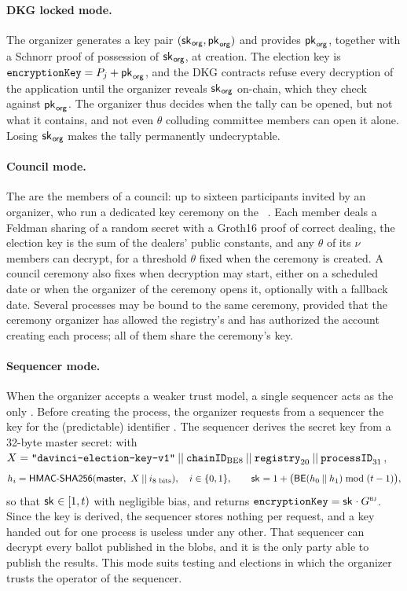 \paragraph{\ac{DKG} locked mode.} The organizer generates a key pair $({\sf{sk}^{}}_{\mathsf{org}}, {\sf{pk}^{}}_{\mathsf{org}})$ and provides ${\sf{pk}^{}}_{\mathsf{org}}$, together with a Schnorr proof of possession of ${\sf{sk}^{}}_{\mathsf{org}}$, at creation. The election key is $\texttt{encryptionKey} = P_j + {\sf{pk}^{}}_{\mathsf{org}}$, and the \ac{DKG} contracts refuse every decryption of the application until the organizer reveals ${\sf{sk}^{}}_{\mathsf{org}}$ on-chain, which they check against ${\sf{pk}^{}}_{\mathsf{org}}$. The organizer thus decides when the tally can be opened, but not what it contains, and not even $\theta$ colluding committee members can open it alone. Losing ${\sf{sk}^{}}_{\mathsf{org}}$ makes the tally permanently undecryptable.

\paragraph{Council mode.} The \keywardens are the members of a council: up to sixteen participants invited by an organizer, who run a dedicated key ceremony on the \councilmanager~\cite{davinci-council}. Each member deals a Feldman sharing of a random secret with a Groth16 proof of correct dealing, the election key is the sum of the dealers' public constants, and any $\theta$ of its $\nu$ members can decrypt, for a threshold $\theta$ fixed when the ceremony is created. A council ceremony also fixes when decryption may start, either on a scheduled date or when the organizer of the ceremony opens it, optionally with a fallback date. Several processes may be bound to the same ceremony, provided that the ceremony organizer has allowed the registry's \counciladapter and has authorized the account creating each process; all of them share the ceremony's key.

\paragraph{Sequencer mode.} When the organizer accepts a weaker trust model, a single sequencer acts as the only \keywarden. Before creating the process, the organizer requests from a sequencer the key for the (predictable) identifier \processid. The sequencer derives the secret key from a 32-byte master secret: with $X = \texttt{"davinci-election-key-v1"} \:||\: \texttt{chainID}_{\text{BE8}} \:||\: \texttt{registry}_{20} \:||\: \texttt{processID}_{31}$,
\[ h_i = \mathsf{HMAC}\text{-}{\sf{SHA256}}(\mathsf{master},\ X \:||\: i_{\text{8 bits}}), \quad i \in \{0, 1\}, \qquad {\sf{sk}^{}} = 1 + \bigl(\mathsf{BE}(h_0 \:||\: h_1) \bmod (t - 1)\bigr), \]
so that ${\sf{sk}^{}} \in [1, t)$ with negligible bias, and returns $\texttt{encryptionKey} = {\sf{sk}^{}} \cdot {G}^{\text{\tiny \sf BJ}}$. Since the key is derived, the sequencer stores nothing per request, and a key handed out for one process is useless under any other. That sequencer can decrypt every ballot published in the blobs, and it is the only party able to publish the results. This mode suits testing and elections in which the organizer trusts the operator of the sequencer.

